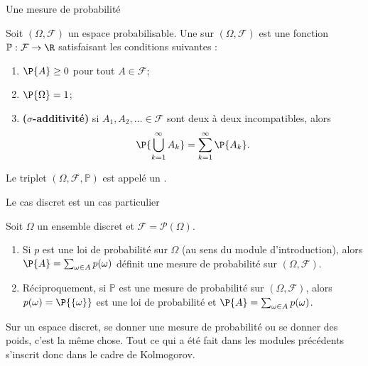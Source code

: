\documentclass[nuit,charter,pied]{BeamerJS}
\newcommand{\tribu}{\mathcal{F}}
\begin{document}
\begin{frame}[t]{Une mesure de probabilité}
\pause
	\begin{defn}{}
		Soit \((\Omega,\tribu)\) un espace probabilisable. Une  sur \((\Omega,\tribu)\) est une fonction \(\mathbb{P}:\tribu\rightarrow \R\) satisfaisant les conditions suivantes :\pause
		\begin{enumerate}
			\item \(\P{A}\geq 0\) pour tout \(A\in\tribu\);\pause
			\item \(\P{\Omega}=1\);\pause
			\item \textbf{(\(\sigma\)-additivité)} si \(A_1,A_2,\ldots\in\tribu\) sont deux à deux incompatibles, alors
			\[\P{\bigcup_{k=1}^{\infty}A_k}=\sum_{k=1}^{\infty}\P{A_k}.\]
		\end{enumerate}
	\end{defn}
	\pause
	Le triplet \((\Omega,\tribu,\mathbb{P})\) est appelé un .
\end{frame}

\begin{frame}[t]{Le cas discret est un cas particulier}
\pause
	\begin{prop}
		Soit \(\Omega\) un ensemble discret et \(\tribu=\mathcal{P}(\Omega)\).
		\begin{enumerate}
			\item Si \(p\) est une loi de probabilité sur \(\Omega\) (au sens du module d'introduction), alors \(\P{A}=\sum_{\omega\in A}p(\omega)\) définit une mesure de probabilité sur \((\Omega,\tribu)\).\pause
			\item Réciproquement, si \(\mathbb{P}\) est une mesure de probabilité sur \((\Omega,\tribu)\), alors \(p(\omega)=\P{\{\omega\}}\) est une loi de probabilité et \(\P{A}=\sum_{\omega\in A}p(\omega)\).
		\end{enumerate}
	\end{prop}
	\pause
	\begin{lumiere}
		Sur un espace discret, se donner une mesure de probabilité ou se donner des poids, c'est la même chose. Tout ce qui a été fait dans les modules précédents s'inscrit donc dans le cadre de Kolmogorov.
	\end{lumiere}
\end{frame}
\end{document}
